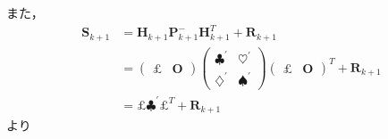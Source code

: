 また，
\begin{align}
  \boldsymbol{S}_{k+1} &= \boldsymbol{H}_{k+1} \boldsymbol{P}_{k+1}^{-} \boldsymbol{H}_{k+1}^{T} + \boldsymbol{R}_{k+1}\\
  &=
  \begin{pmatrix}
    \pounds & \boldsymbol{O}
  \end{pmatrix}
  \begin{pmatrix}
    \clubsuit^{'} & \heartsuit^{'}\\
    \diamondsuit^{'} & \spadesuit^{'}
  \end{pmatrix}
  \begin{pmatrix}
    \pounds & \boldsymbol{O}
  \end{pmatrix}^{T} + \boldsymbol{R}_{k+1}\\
  &=
  \pounds \clubsuit^{'} \pounds^{T} + \boldsymbol{R}_{k+1}
\end{align}
より
